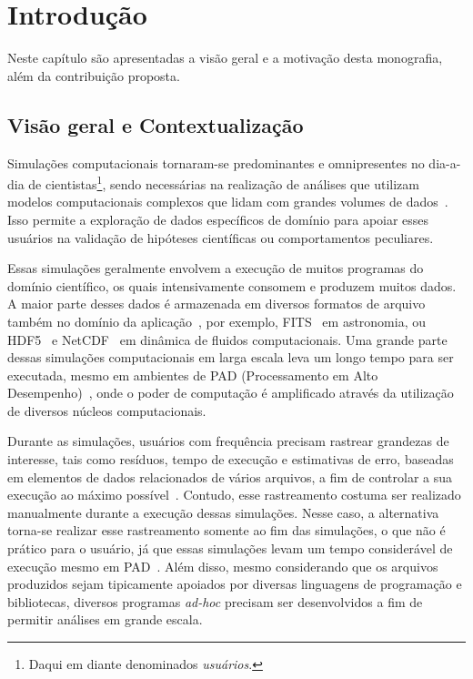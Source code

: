 
\chapter{Introdução}

Neste capítulo são apresentadas a visão geral e a motivação desta monografia, além da contribuição proposta.

\section{Visão geral e Contextualização}

Simulações computacionais tornaram-se predominantes e omnipresentes no dia-a-dia de cientistas\footnote{Daqui em diante denominados \textit{usuários}.}, sendo necessárias na realização de análises que utilizam modelos computacionais complexos que lidam com grandes volumes de dados~\cite{silva2015analyzing}. Isso permite a exploração de dados específicos de domínio para apoiar esses usuários na validação de hipóteses científicas ou comportamentos peculiares.

Essas simulações geralmente envolvem a execução de muitos programas do domínio científico, os quais intensivamente consomem e produzem muitos dados. A maior parte desses dados é armazenada em diversos formatos de arquivo também no domínio da aplicação~\cite{silva2015analyzing}, por exemplo,  FITS~\cite{greisen2002representations} em astronomia, ou  HDF5~\cite{folk1999hdf5} e  NetCDF~\cite{rew1990netcdf} em dinâmica de fluidos computacionais.
Uma grande parte dessas simulações computacionais em larga escala leva um longo tempo para ser executada, mesmo em ambientes de  PAD (Processamento em Alto Desempenho)~\cite{silva2017raw}, onde o poder de computação é amplificado através da utilização de diversos núcleos computacionais.

Durante as simulações, usuários com frequência precisam rastrear grandezas de interesse, tais como resíduos, tempo de execução e estimativas de erro, baseadas em elementos de dados relacionados de vários arquivos, a fim de controlar a sua execução ao máximo possível~\cite{silva2016situ}. Contudo, esse rastreamento costuma ser realizado manualmente durante a execução dessas simulações. Nesse caso, a alternativa torna-se realizar esse rastreamento somente ao fim das simulações, o que não é prático para o usuário, já que essas simulações levam um tempo considerável de execução mesmo em PAD~\cite{silva2017raw}. Além disso, mesmo considerando que os arquivos produzidos sejam tipicamente apoiados por diversas linguagens de programação e bibliotecas, diversos programas \textit{ad-hoc} precisam ser desenvolvidos a fim de permitir análises em grande escala.

